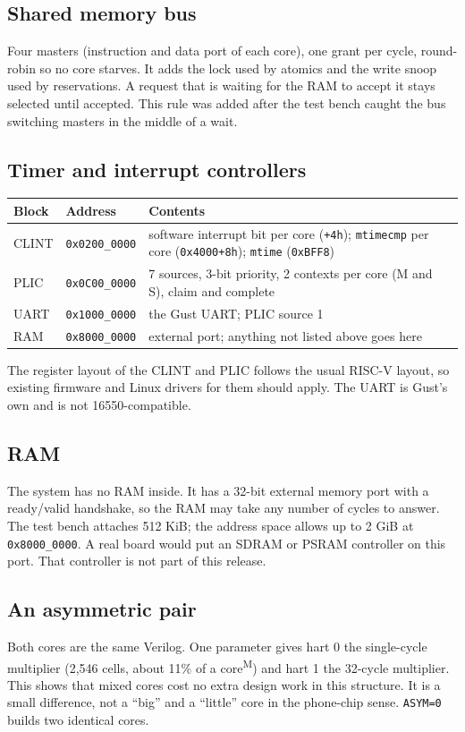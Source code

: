 \documentclass[10pt,a4paper]{article}
\newcommand{\code}[1]{\texttt{#1}}
\newcommand{\meas}{\textsuperscript{M}}
\begin{document}
\subsection{Shared memory bus}
Four masters (instruction and data port of each core), one grant per cycle, round-robin so no core
starves. It adds the lock used by atomics and the write snoop used by reservations. A request that is
waiting for the RAM to accept it stays selected until accepted. This rule was added after the test bench
caught the bus switching masters in the middle of a wait.

\subsection{Timer and interrupt controllers}
\begin{center}\small
\begin{tabular}{@{}lll@{}}
\toprule
Block & Address & Contents\\
\midrule
CLINT & \code{0x0200\_0000} & software interrupt bit per core (\code{+4h}); \code{mtimecmp} per core (\code{0x4000+8h}); \code{mtime} (\code{0xBFF8})\\
PLIC & \code{0x0C00\_0000} & 7 sources, 3-bit priority, 2 contexts per core (M and S), claim and complete\\
UART & \code{0x1000\_0000} & the Gust UART; PLIC source 1\\
RAM & \code{0x8000\_0000} & external port; anything not listed above goes here\\
\bottomrule
\end{tabular}
\end{center}
The register layout of the CLINT and PLIC follows the usual RISC-V layout, so existing firmware and
Linux drivers for them should apply. The UART is Gust's own and is not 16550-compatible.

\subsection{RAM}
The system has no RAM inside. It has a 32-bit external memory port with a ready/valid handshake, so the
RAM may take any number of cycles to answer. The test bench attaches 512 KiB; the address space allows
up to 2 GiB at \code{0x8000\_0000}. A real board would put an SDRAM or PSRAM controller on this port.
That controller is not part of this release.

\subsection{An asymmetric pair}
Both cores are the same Verilog. One parameter gives hart 0 the single-cycle multiplier (2{,}546 cells,
about 11\% of a core\meas) and hart 1 the 32-cycle multiplier. This shows that mixed cores cost no
extra design work in this structure. It is a small difference, not a ``big'' and a ``little'' core in the
phone-chip sense. \code{ASYM=0} builds two identical cores.
\end{document}
